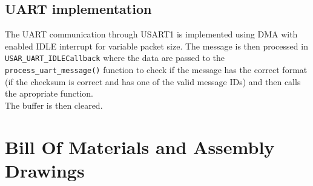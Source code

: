 \documentclass[12pt, a4paper]{article}
\begin{document}
\subsection{UART implementation}
The UART communication through USART1 is implemented using DMA with enabled IDLE interrupt for variable packet size. The message is then processed in \verb|USAR_UART_IDLECallback| where the data are passed to the \verb|process_uart_message()| function to check if the message has the correct format (if the checksum is correct and has one of the valid message IDs) and then calls the apropriate function.\\
The buffer is then cleared.


\pagebreak

\section{Bill Of Materials and Assembly Drawings}
\end{document}
